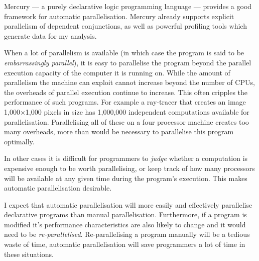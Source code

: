 Mercury --- a purely declarative logic programming language ---
provides a good framework for automatic parallelisation.  Mercury
already supports explicit parallelism of dependent conjunctions, as
well as powerful profiling tools which generate data for my analysis.

When a lot of parallelism is available (in which case the program is said to
be \emph{embarrassingly parallel}), it is easy to parallelise the
program beyond the parallel execution capacity of the computer it is
running on.
While the amount of parallelism the machine can exploit
cannot increase beyond the number of CPUs,
the overheads of parallel execution continue to increase.
This often cripples the performance of such programs.
For example a ray-tracer that creates an image
1,000$\times$1,000 pixels in size has 1,000,000 independent computations
available for parallelisation.
Parallelising all of these on a four processor machine creates too
many overheads, more than would be necessary to parallelise this program
optimally.

In other cases it is difficult for programmers to \emph{judge} whether
a computation is expensive enough to be worth parallelising,
or keep track of how many processors will be available at any given
time during the program's execution.
This makes automatic parallelisation desirable.

I expect that automatic parallelisation will more easily and
effectively parallelise declarative programs than manual
parallelisation.
Furthermore, if a program is modified it's performance characteristics
are also likely to change and it would need to be
\emph{re-parallelised}.
Re-parallelising a program manually will be a tedious waste of time,
automatic parallelisation will save programmers a lot of time in these
situations.

